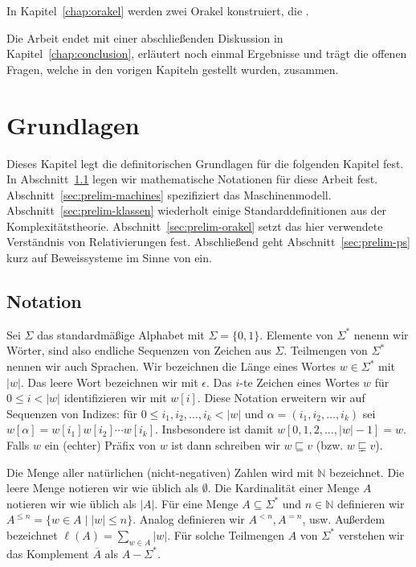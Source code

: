 In Kapitel~\ref{chap:orakel} werden zwei Orakel konstruiert, die .

Die Arbeit endet mit einer abschließenden Diskussion in Kapitel~\ref{chap:conclusion}, erläutert noch einmal Ergebnisse und trägt die offenen Fragen, welche in den vorigen Kapiteln gestellt wurden, zusammen.




\chapter{Grundlagen}\label{chap:prelim}

Dieses Kapitel legt die definitorischen Grundlagen für die folgenden Kapitel fest. In Abschnitt~\ref{sec:notation} legen wir mathematische Notationen für diese Arbeit fest. Abschnitt~\ref{sec:prelim-machines} spezifiziert das Maschinenmodell.  Abschnitt~\ref{sec:prelim-klassen} wiederholt einige Standarddefinitionen aus der Komplexitätstheorie. Abschnitt~\ref{sec:prelim-orakel} setzt das hier verwendete Verständnis von Relativierungen fest. Abschließend geht Abschnitt~\ref{sec:prelim-ps} kurz auf Beweissysteme im Sinne von \textcite{cook_relative_1979} ein.

\section{Notation}\label{sec:notation}

Sei $\Sigma$ das standardmäßige Alphabet mit $\Sigma=\{0,1\}$. Elemente von $\Sigma^*$ nenenn wir Wörter, sind also endliche Sequenzen von Zeichen aus $\Sigma$. Teilmengen von $\Sigma^*$ nennen wir auch Sprachen. Wir bezeichnen die Länge eines Wortes $w\in\Sigma^*$ mit $|w|$. Das leere Wort bezeichnen wir mit $\epsilon$. Das $i$-te Zeichen eines Wortes $w$ für $0\leq i< |w|$ identifizieren wir mit $w[i]$. Diese Notation erweitern wir auf Sequenzen von Indizes: für $0\leq i_1, i_2, \dots, i_k< |w|$ und $\alpha=(i_1, i_2, \dots, i_k)$ sei $w[\alpha] = w[i_1]w[i_2]\cdots w[i_k]$. Insbesondere ist damit $w[0,1,2,\dots, |w|-1]= w$.
Falls $w$ ein (echter) Präfix von $w$ ist dann schreiben wir $w \sqsubseteq v$ (bzw. $w\sqsubsetneq v$).

Die Menge aller natürlichen (nicht-negativen) Zahlen wird mit $\mathbb N$ bezeichnet. Die leere Menge notieren wir wie üblich als $\emptyset$. Die Kardinalität einer Menge $A$ notieren wir wie üblich als $|A|$. Für eine Menge $A\subseteq\Sigma^*$ und $n\in \mathbb N$ definieren wir $A^{\leq n} = \{ w\in A \mid |w|\leq n\}$. Analog definieren wir $A^{<n}, A^{=n}$, usw. Außerdem bezeichnet $\ell(A)=\sum_{w\in A} |w|$. Für solche Teilmengen $A$ von $\Sigma^*$ verstehen wir das Komplement $\overline{A}$ als $A-\Sigma^*$.

